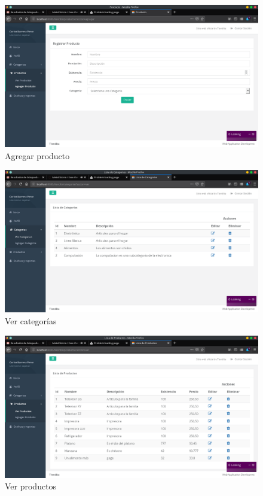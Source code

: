 \documentclass[a4paper,12pt]{article}
\begin{document}
\begin{figure}[H]
\begin{center}
 \includegraphics[width=\textwidth]{agregar_producto.png}
 \caption{Agregar producto}
 \label{fig:agregar_producto}
\end{center}
\end{figure}

\begin{figure}[H]
\begin{center}
 \includegraphics[width=\textwidth]{ver_categorias.png}
 \caption{Ver categorías}
 \label{fig:ver_categorias}
\end{center}
\end{figure}

\begin{figure}[H]
\begin{center}
 \includegraphics[width=\textwidth]{ver_productos.png}
 \caption{Ver productos}
 \label{fig:ver_productos}
\end{center}
\end{figure}
\end{document}
